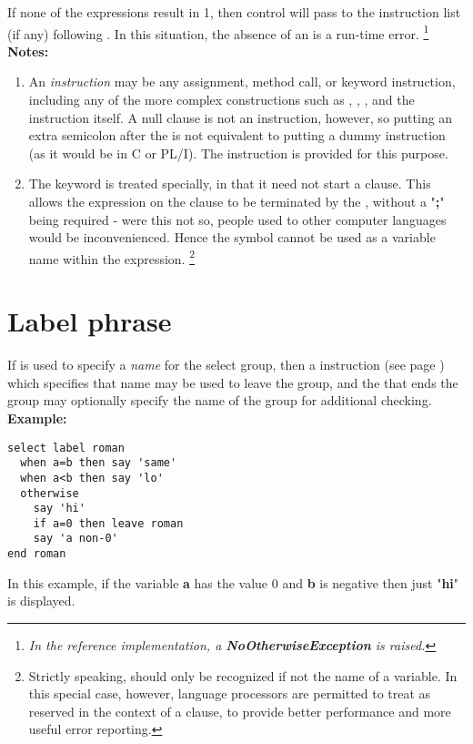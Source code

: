 If none of the  expressions result in 1, then control will
pass to the instruction list (if any) following .
In this situation, the absence of an  is a run-time
error.
\footnote{
\emph{In the reference implementation, a \textbf{NoOtherwiseException}
is raised.}
}
 \textbf{Notes:}
\begin{enumerate}
\item An \emph{instruction} may be any assignment, method call, or keyword
instruction, including any of the more complex constructions such as
, , , and the 
instruction itself.
A null clause is not an instruction, however, so putting an extra
semicolon after the  is not equivalent to putting a dummy
instruction (as it would be in C or PL/I).
The  instruction is provided for this purpose.
\item The keyword  is treated specially, in that it need not
start a clause.
This allows the expression on the  clause to be terminated
by the , without a "\textbf{;}" being required
- were this not so, people used to other computer languages would
be inconvenienced.
Hence the symbol  cannot be used as a variable name within
the expression.
\footnote{
Strictly speaking,  should only be recognized if not
the name of a variable.  In this special case, however, \nr{} language
processors are permitted to treat  as reserved in the
context of a  clause, to provide better performance and
more useful error reporting.
}
\end{enumerate}
\section{Label phrase}
 
If  is used to specify a \emph{name} for the select
group, then a   instruction (see page \pageref{refleave})  which
specifies that name may be used to leave the group, and the 
that ends the group may optionally specify the name of the group for
additional checking.
 \textbf{Example:}
\begin{lstlisting}
select label roman
  when a=b then say 'same'
  when a<b then say 'lo'
  otherwise
    say 'hi'
    if a=0 then leave roman
    say 'a non-0'
end roman
\end{lstlisting}
In this example, if the variable \textbf{a} has the value 0
and \textbf{b} is negative then just "\textbf{hi}" is
displayed.
